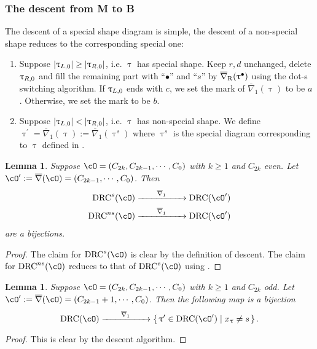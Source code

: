 \documentclass[12pt,a4paper]{amsart}
\def\abs#1{\left|{#1}\right|}
\def\eDD{\overline{\nabla}}
\def\eDDo{\overline{\nabla}_1}
\numberwithin{equation}{section}
\newtheorem{lem}[thm]{Lemma}
\theoremstyle{remark}
\def\drc{\mathrm{DRC}}
\def\drcs{\mathrm{DRC}^{s}}
\def\drcns{\mathrm{DRC}^{ns}}
\def\cOp{\cO^{\prime}}
\def\uptaup{\uptau^{\prime}}
\begin{document}
\subsubsection{The descent from M to B}
The descent of a special shape diagram is simple, the descent of a non-special shape
reduces to the corresponding special one:
\begin{enumerate}[resume*=alg1]
  \item Suppose $\abs{\taulf} \geq \abs{\taurf} $, i.e. $\uptau$ has special shape.
   Keep $r,d$ unchanged, delete $\uptau_{R,0}$ and fill the remaining part with
   ``$\bullet$'' and ``$s$'' by $\DDr(\uptau^{\bullet})$ using the dot-s switching algorithm.
        If $\uptau_{L,0}$ ends with $c$, we set the mark of $\eDDo(\uptau)$ to be $a$.
        Otherwise, we set the mark to be $b$.
   \item Suppose $\abs{\taulf} < \abs{\taurf}$, i.e. $\uptau$ has non-special shape.
        We define $\uptaup=\eDDo(\uptau):=\eDDo(\uptau^{s})$ where $\uptau^{s}$ is the
        special diagram corresponding to $\uptau$ defined in .
\end{enumerate}

\begin{lem}\label{lem:ds.BM}
  Suppose $\cO = (C_{2k},C_{2k-1}, \cdots, C_{0})$ with $k\geq 1$ and $C_{2k}$ even.
  Let $\cOp := \eDD(\cO)=(C_{2k-1},\cdots, C_{0})$.
  Then
  \[
    \begin{split}
      \drcs(\cO) &\xrightarrow{\hspace{2em}\eDDo\hspace{2em}} \drc(\cOp) \\
      \drcns(\cO)&
      \xrightarrow{\hspace{2em}\eDDo\hspace{2em}} \drc(\cOp)
    \end{split}
  \]
  are a bijections.
\end{lem}
\begin{proof}
  The claim for $\drcs(\cO)$ is clear by the definition of descent.
  The claim for $\drcns(\cO)$ reduces to that of $\drcs(\cO)$ using .
\end{proof}

\begin{lem}\label{lem:gd.CD}
  Suppose $\cO = (C_{2k},C_{2k-1}, \cdots, C_{0})$ with $k\geq 1$ and $C_{2k}$ odd.
  Let $\cOp := \eDD(\cO)=(C_{2k-1}+1,\cdots, C_{0})$.
  Then the following map is a bijection
  \[
      \drc(\cO) \xrightarrow{\hspace{2em}\eDDo\hspace{2em}} \set{\uptaup\in \drc(\cOp)| x_{\uptau}\neq s}. %
  \]
\end{lem}
\begin{proof}
  This is clear by the descent algorithm.
\end{proof}
\end{document}
